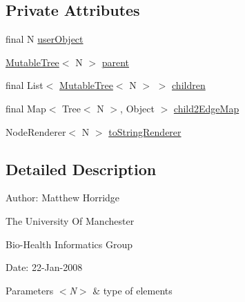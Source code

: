 \subsection*{Private Attributes}
\begin{DoxyCompactItemize}
\item 
final N \hyperlink{classuk_1_1ac_1_1manchester_1_1cs_1_1bhig_1_1util_1_1_mutable_tree_3_01_n_01_4_aa8480fa5683b8058231a055ed85901c5}{user\-Object}
\item 
\hyperlink{classuk_1_1ac_1_1manchester_1_1cs_1_1bhig_1_1util_1_1_mutable_tree_3_01_n_01_4_aa66d9d4e5367d2cd6d3f31a9700c8ffe}{Mutable\-Tree}$<$ N $>$ \hyperlink{classuk_1_1ac_1_1manchester_1_1cs_1_1bhig_1_1util_1_1_mutable_tree_3_01_n_01_4_a822690317c83aec9e5db7028f172ce1a}{parent}
\item 
final List$<$ \hyperlink{classuk_1_1ac_1_1manchester_1_1cs_1_1bhig_1_1util_1_1_mutable_tree_3_01_n_01_4_aa66d9d4e5367d2cd6d3f31a9700c8ffe}{Mutable\-Tree}$<$ N $>$ $>$ \hyperlink{classuk_1_1ac_1_1manchester_1_1cs_1_1bhig_1_1util_1_1_mutable_tree_3_01_n_01_4_a4086d92fa748866fbf1a0ec0267d8e9a}{children}
\item 
final Map$<$ Tree$<$ N $>$, Object $>$ \hyperlink{classuk_1_1ac_1_1manchester_1_1cs_1_1bhig_1_1util_1_1_mutable_tree_3_01_n_01_4_a8b12a4eb7338e527d9c9889240e5eb4a}{child2\-Edge\-Map}
\item 
Node\-Renderer$<$ N $>$ \hyperlink{classuk_1_1ac_1_1manchester_1_1cs_1_1bhig_1_1util_1_1_mutable_tree_3_01_n_01_4_af6415ed590829a7d215abcc7fbda30c7}{to\-String\-Renderer}
\end{DoxyCompactItemize}


\subsection{Detailed Description}
Author\-: Matthew Horridge\par
 The University Of Manchester\par
 Bio-\/\-Health Informatics Group\par
 Date\-: 22-\/\-Jan-\/2008\par
 \par



\begin{DoxyParams}{Parameters}
{\em $<$\-N$>$} & type of elements \\
\hline
\end{DoxyParams}


